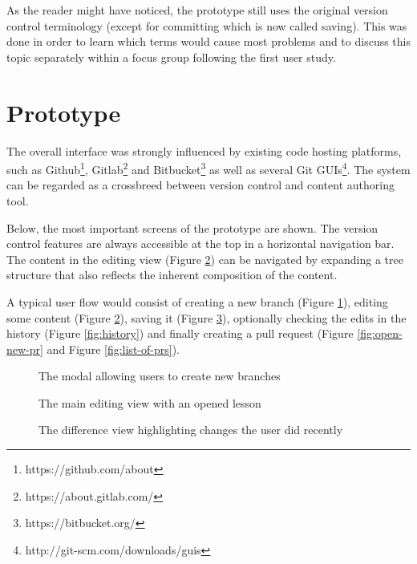 As the reader might have noticed, the prototype still uses the original version control terminology (except for committing which is now called saving). This was done in order to learn which terms would cause most problems and to discuss this topic separately within a focus group following the first user study.

\section{Prototype}
The overall interface was strongly influenced by existing code hosting platforms, such as Github\footnote{https://github.com/about}, Gitlab\footnote{https://about.gitlab.com/} and Bitbucket\footnote{https://bitbucket.org/} as well as several Git GUIs\footnote{http://git-scm.com/downloads/guis}. The system can be regarded as a crossbreed between version control and content authoring tool.

Below, the most important screens of the prototype are shown. The version control features are always accessible at the top in a horizontal navigation bar. The content in the editing view (Figure \ref{fig:prot-initial-editor-view}) can be navigated by expanding a tree structure that also reflects the inherent composition of the content.

A typical user flow would consist of creating a new branch (Figure \ref{fig:create-branch}), editing some content (Figure \ref{fig:prot-initial-editor-view}), saving it (Figure \ref{fig:unsaved-changes}), optionally checking the edits in the history (Figure \ref{fig:history}) and finally creating a pull request (Figure \ref{fig:open-new-pr} and Figure \ref{fig:list-of-prs}).

\begin{figure}[h!]
 \centering
 \caption{The modal allowing users to create new branches}
 \label{fig:create-branch}
\end{figure}


\begin{figure}[h!]
 \centering
 \caption{The main editing view with an opened lesson}
 \label{fig:prot-initial-editor-view}
\end{figure}

\begin{figure}[h!]
 \centering
 \caption{The difference view highlighting changes the user did recently}
 \label{fig:unsaved-changes}
\end{figure}

